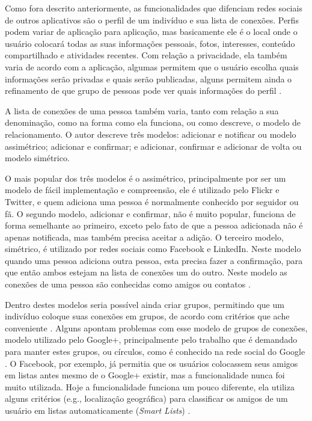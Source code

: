\documentclass[diss]{template/setrem}
\begin{document}
Como fora descrito anteriormente, as funcionalidades que difenciam redes sociais de outros aplicativos são o perfil de um indivíduo e sua lista de conexões. Perfis podem variar de aplicação para aplicação, mas basicamente ele é o local onde o usuário colocará todas as suas informações pessoais, fotos, interesses, conteúdo compartilhado e atividades recentes. Com relação a privacidade, ela também varia de acordo com a aplicação, algumas permitem que o usuário escolha quais informações serão privadas e quais serão publicadas, alguns permitem ainda o refinamento de que grupo de pessoas pode ver quais informações do perfil \citep{Farkas2007, Boyd2007, Bell2009}.

A lista de conexões de uma pessoa também varia, tanto com relação a sua denominação, como na forma como ela funciona, ou como \citet{Bell2009} descreve, o modelo de relacionamento. O autor descreve três modelos: adicionar e notificar ou modelo assimétrico; adicionar e confirmar; e adicionar, confirmar e adicionar de volta ou modelo simétrico.

O mais popular dos três modelos é o assimétrico, principalmente por ser um modelo de fácil implementação e compreensão, ele é utilizado pelo Flickr e Twitter, e quem adiciona uma pessoa é normalmente conhecido por seguidor ou fã. O segundo modelo, adicionar e confirmar, não é muito popular, funciona de forma semelhante ao primeiro, exceto pelo fato de que a pessoa adicionada não é apenas notificada, mas também precisa aceitar a adição. O terceiro modelo, simétrico, é utilizado por redes sociais como Facebook e LinkedIn. Neste modelo quando uma pessoa adiciona outra pessoa, esta precisa fazer a confirmação, para que então ambos estejam na lista de conexões um do outro. Neste modelo as conexões de uma pessoa são conhecidas como amigos ou contatos \citep{Boyd2007, Bell2009}.

Dentro destes modelos seria possível ainda criar grupos, permitindo que um indivíduo coloque suas conexões em grupos, de acordo com critérios que ache conveniente \citep{Bell2009}. Alguns apontam problemas com esse modelo de grupos de conexões, modelo utilizado pelo Google+, principalmente pelo trabalho que é demandado para manter estes grupos, ou círculos, como é conhecido na rede social do Google \citep{Siegler2011}. O Facebook, por exemplo, já permitia que os usuários colocassem seus amigos em listas antes mesmo de o Google+ existir, mas a funcionalidade nunca foi muito utilizada. Hoje a funcionalidade funciona um pouco diferente, ela utiliza alguns critérios (e.g., localização geográfica) para classificar os amigos de um usuário em listas automaticamente (\emph{Smart Lists}) \citep{Kumparak2011}.
\end{document}
